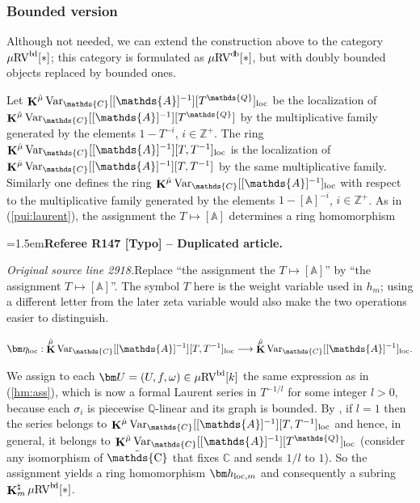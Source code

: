\documentclass[12pt]{amsart}
\newcommand{\RefereeRemark}[4]{%
  \par\medskip\begingroup\normalfont\small\color{RefereePurple}%
  \emergencystretch=1.5em\noindent\textbf{Referee R#1 [#2] -- #3.}\par\nobreak\noindent #4\par
  \endgroup\medskip
}
\theoremstyle{plain}
\theoremstyle{definition}
\theoremstyle{remark}
\numberwithin{equation}{section}
\theoremstyle{plain}
\newcommand{\RV}{\textup{RV}}
\newcommand{\Z}{\mathds{Z}}
\newcommand{\A}{\mathds{A}}
\newcommand{\C}{\mathds{C}}
\newcommand{\Q}{\mathds{Q}}
\newcommand{\0}{\emptyset}
\newcommand{\fun}{\longrightarrow}
\newcommand{\efun}{\longmapsto}
\newcommand{\mgRV}{{\mu}{\RV}}
\DeclareMathOperator{\ggk}{\mathbf{K}}
\DeclareMathOperator{\db}{d \! b}
\DeclareMathOperator{\bdd}{b \! d}
\newcommand{\var}{\textup{Var}}
\DeclareMathOperator{\puC}{\tilde \C}
\newcommand{\loc}{\textup{loc}}
\newcommand{\gmv}{\ggk^{\hat \mu}\var_{\C}}
\begin{document}
\subsubsection{Bounded version}
\label{sec:hm:bounded}
Although not needed, we can  extend the construction above to the category $\mgRV^{\bdd}[*]$; this category is formulated as $\mgRV^{\db}[*]$, but with doubly bounded objects replaced by bounded ones.

Let $\gmv[[\A]^{-1}][T^{\Q}]_{\loc}$ be the localization of $\gmv[[\A]^{-1}][T^{\Q}]$ by the multiplicative family generated by the elements $1 - T^{-i}$, $i \in \Z^+$. The ring $\gmv[[\A]^{-1}][T, T^{-1}]_{\loc}$ is the localization of $\gmv[[\A]^{-1}][T, T^{-1}]$ by the same multiplicative family. Similarly one defines the ring $\gmv[[\A]^{-1}]_{\loc}$ with respect to the multiplicative family generated by the elements $1 - [\A]^{-i}$, $i \in \Z^+$. As in (\ref{pui:laurent}), the assignment the $T \efun [\A]$ determines a ring homomorphism

\RefereeRemark{147}{Typo}{Duplicated article}{%
\textit{Original source line 2918.}\quad Replace ``the assignment the $T\efun[\A]$'' by ``the assignment $T\efun[\A]$''. The symbol $T$ here is the weight variable used in $h_m$; using a different letter from the later zeta variable would also make the two operations easier to distinguish.
}
\begin{equation}\label{pui:laurent:loc}
  \bm \eta_{\loc} : \gmv[[\A]^{-1}][T, T^{-1}]_{\loc} \fun \gmv[[\A]^{-1}]_{\loc}.
\end{equation}


We assign to each $\bm U= (U, f, \omega) \in \mgRV^{\bdd}[k]$ the same expression as in (\ref{hm:ass}), which is now a formal Laurent series in $T^{-1/l}$ for some integer $l > 0$, because each $\sigma_i$ is piecewise $\Q$-linear  and its graph is bounded. By \cite[Lemma~8.2.1]{hru:loe:lef}, if $l =1$ then the series belongs to $\gmv[[\A]^{-1}][T, T^{-1}]_{\loc}$ and hence,  in general, it belongs to $\gmv[[\A]^{-1}][T^{\Q}]_{\loc}$ (consider any isomorphism of $\puC$ that fixes $\C$ and sends $1/l$ to $1$).  So the assignment  yields a ring homomorphism $\bm h_{\loc,m}$ and consequently a subring $\ggk^\natural_m \mgRV^{\bdd}[*]$.
\end{document}
